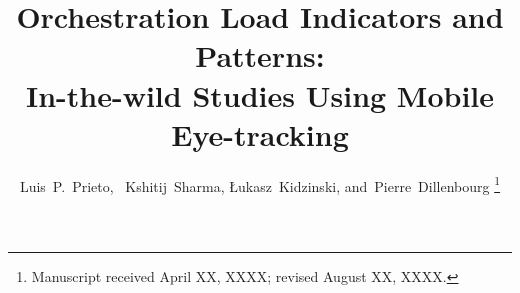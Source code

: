 \documentclass[10pt,journal,compsoc]{IEEEtran}
\begin{document}
%
\title{Orchestration Load Indicators and Patterns:\\In-the-wild Studies Using Mobile Eye-tracking}
%
%
%
%

\author{Luis~P.~Prieto,~
        Kshitij~Sharma,
        {\L}ukasz~Kidzinski,
        and~Pierre~Dillenbourg%
\thanks{Manuscript received April XX, XXXX; revised August XX, XXXX.}}
\end{document}
